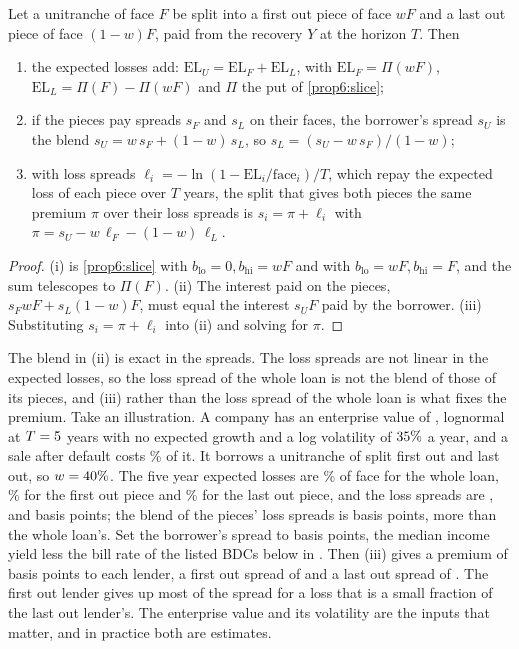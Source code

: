 \begin{chapterrefs}
\begin{proposition}\label{prop6:unitranche}
Let a unitranche of face $F$ be split into a first out piece of face $wF$ and a last out piece of face
$(1-w)F$, paid from the recovery $Y$ at the horizon $T$. Then
\begin{enumerate}[label=(\roman*)]
  \item the expected losses add: $\mathrm{EL}_U=\mathrm{EL}_F+\mathrm{EL}_L$, with
        $\mathrm{EL}_F=\Pi(wF)$, $\mathrm{EL}_L=\Pi(F)-\Pi(wF)$ and $\Pi$ the put of \cref{prop6:slice};
  \item if the pieces pay spreads $s_F$ and $s_L$ on their faces, the borrower's spread $s_U$ is the
        blend $s_U=w\,s_F+(1-w)\,s_L$, so $s_L=(s_U-w\,s_F)/(1-w)$;
  \item with loss spreads $\ell_i=-\ln(1-\mathrm{EL}_i/\text{face}_i)/T$, which repay the expected loss of
        each piece over $T$ years, the split that gives both pieces the same premium $\pi$ over their
        loss spreads is $s_i=\pi+\ell_i$ with $\pi=s_U-w\,\ell_F-(1-w)\,\ell_L$.
\end{enumerate}
\end{proposition}

\begin{proof}
(i) is \cref{prop6:slice} with $b_{\mathrm{lo}}=0,b_{\mathrm{hi}}=wF$ and with $b_{\mathrm{lo}}=wF,b_{\mathrm{hi}}=F$,
and the sum telescopes to $\Pi(F)$. (ii) The interest paid on the pieces, $s_FwF+s_L(1-w)F$, must equal
the interest $s_UF$ paid by the borrower. (iii) Substituting $s_i=\pi+\ell_i$ into (ii) and solving for
$\pi$.
\end{proof}

The blend in (ii) is exact in the spreads. The loss spreads are not linear in the expected losses, so
the loss spread of the whole loan is not the blend of those of its pieces, and (iii) rather than the loss
spread of the whole loan is what fixes the premium. Take an illustration. A company has an enterprise
value of \utV, lognormal at $T=5$ years with no expected growth and a log volatility of $35\%$ a
year, and a sale after default costs \utCost\% of it. It borrows a unitranche of \utFace{} split \utFo{}
first out and \utLo{} last out, so $w=40\%$.  The five year expected losses are \utElU\% of
face for the whole loan, \utElF\% for the first out piece and \utElL\% for the last out piece, and the loss
spreads are \utLsU, \utLsF{} and \utLsL{} basis points; the blend of the pieces' loss spreads is
\utLsBlend{} basis points, more than the whole loan's. Set the borrower's spread to \utSu{} basis points, the median
income yield less the bill rate of the listed BDCs below in \dlLast. Then (iii) gives a premium of \utPi{} basis points to each
lender, a first out spread of \utSf{} and a last out spread of \utSl. The first out lender gives up most
of the spread for a loss that is a small fraction of the last out lender's. The enterprise value and its
volatility are the inputs that matter, and in practice both are estimates.


\end{chapterrefs}
